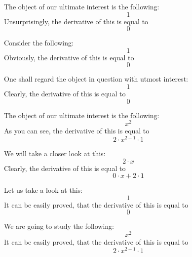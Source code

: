 \documentclass{article}
\begin{document}
The object of our ultimate interest is the following:
\begin{equation}
1 
\end{equation}
Unsurprisingly, the derivative of this is equal to
\begin{equation}
0 
\end{equation}

Consider the following:
\begin{equation}
1 
\end{equation}
Obviously, the derivative of this is equal to
\begin{equation}
0 
\end{equation}

One shall regard the object in question with utmost interest:
\begin{equation}
1 
\end{equation}
Clearly, the derivative of this is equal to
\begin{equation}
0 
\end{equation}

The object of our ultimate interest is the following:
\begin{equation}
x ^{2 } 
\end{equation}
As you can see, the derivative of this is equal to
\begin{equation}
2 \cdot x ^{2 - 1 } \cdot 1 
\end{equation}

We will take a closer look at this:
\begin{equation}
2 \cdot x 
\end{equation}
Clearly, the derivative of this is equal to
\begin{equation}
0 \cdot x + 2 \cdot 1 
\end{equation}

Let us take a look at this:
\begin{equation}
1 
\end{equation}
It can be easily proved, that the derivative of this is equal to
\begin{equation}
0 
\end{equation}

We are going to study the following:
\begin{equation}
x ^{2 } 
\end{equation}
It can be easily proved, that the derivative of this is equal to
\begin{equation}
2 \cdot x ^{2 - 1 } \cdot 1 
\end{equation}
\end{document}
